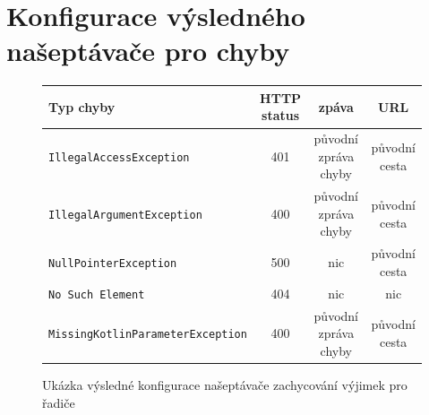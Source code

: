 \chapter{Konfigurace výsledného našeptávače pro chyby}\label{dodatek:excpetion-handler2}
    \begin{figure} \centering

    \begin{adjustbox}{angle=90} \centering
            \begin{tabular}{|l|c|c|c|}\hline
        	  Typ chyby		& HTTP status		& zpáva	& URL 	\tabularnewline \hline \hline
        	  \texttt{IllegalAccessException}	& 401	& původní zpráva chyby		& původní cesta     \tabularnewline \hline
        	  \texttt{IllegalArgumentException}	& 400	& původní zpráva chyby		& původní cesta     \tabularnewline \hline
        	  \texttt{NullPointerException}	& 500	& nic		& původní cesta     \tabularnewline \hline
        	  \texttt{No Such Element}	& 404	& nic		& nic     \tabularnewline \hline
        	  \texttt{MissingKotlinParameterException}	& 400	& původní zpráva chyby		& původní cesta     \tabularnewline \hline
            \end{tabular}
    \end{adjustbox} \caption[Konfigurace výsledného našeptávače pro řadiče]{Ukázka výsledné konfigurace našeptávače zachycování výjimek pro řadiče}
    \end{figure}
